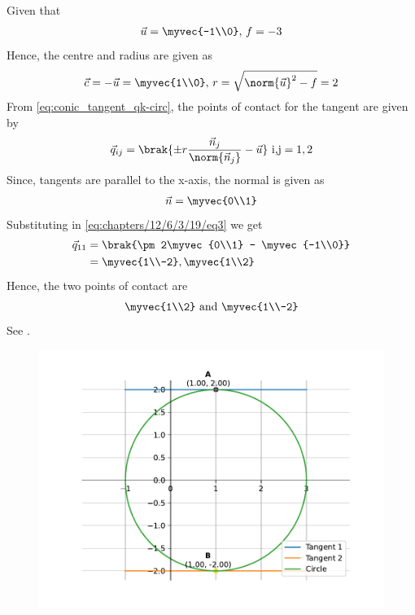 Given that 
\begin{align}
	\vec{u} = \myvec{-1\\0},\,
	f = -3
\end{align}
Hence, the centre and radius are given as
\begin{align}
	\vec{c} = -\vec{u} = \myvec{1\\0},\,
	r = \sqrt{\norm{\vec{u}}^2 - f}
	  = 2
\end{align}
From \eqref{eq:conic_tangent_qk-circ},
the points of contact for the tangent are given by
\begin{align}
	\label{eq:chapters/12/6/3/19/eq3}
	\vec{q}_{ij} = \brak{\pm r\frac{\vec{n}_j}{\norm{\vec{n}_j}}-\vec{u}} \text{ i,j} = 1,2
\end{align}
Since, tangents are parallel to the x-axis, the normal is given as
\begin{align}
	\vec{n} = \myvec{0\\1}
\end{align}
Substituting in \eqref{eq:chapters/12/6/3/19/eq3} we get
\begin{align}
	\vec{q}_{11} &= \brak{\pm 2\myvec{0\\1} - \myvec{-1\\0}}\\
	&= \myvec{1\\-2},\myvec{1\\2}
\end{align}
Hence, the two points of contact are
\begin{align}
	\myvec{1\\2} \text{ and } \myvec{1\\-2}
\end{align}
See .
\begin{figure}[H]
	\begin{center} 
	    \includegraphics[width=0.75\columnwidth]{chapters/12/6/3/19/figs/fig.pdf}
	\end{center}
\caption{}
\label{fig:chapters/12/6/3/19/Fig1}
\end{figure}





















